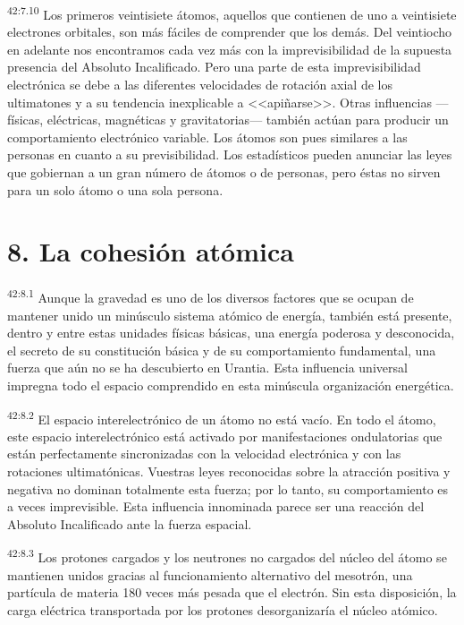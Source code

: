 \par
\textsuperscript{42:7.10} Los primeros veintisiete átomos, aquellos que contienen de uno a veintisiete electrones orbitales, son más fáciles de comprender que los demás. Del veintiocho en adelante nos encontramos cada vez más con la imprevisibilidad de la supuesta presencia del Absoluto Incalificado. Pero una parte de esta imprevisibilidad electrónica se debe a las diferentes velocidades de rotación axial de los ultimatones y a su tendencia inexplicable a <<apiñarse>>. Otras influencias ---físicas, eléctricas, magnéticas y gravitatorias--- también actúan para producir un comportamiento electrónico variable. Los átomos son pues similares a las personas en cuanto a su previsibilidad. Los estadísticos pueden anunciar las leyes que gobiernan a un gran número de átomos o de personas, pero éstas no sirven para un solo átomo o una sola persona.

\section*{8. La cohesión atómica}
\par
\textsuperscript{42:8.1} Aunque la gravedad es uno de los diversos factores que se ocupan de mantener unido un minúsculo sistema atómico de energía, también está presente, dentro y entre estas unidades físicas básicas, una energía poderosa y desconocida, el secreto de su constitución básica y de su comportamiento fundamental, una fuerza que aún no se ha descubierto en Urantia. Esta influencia universal impregna todo el espacio comprendido en esta minúscula organización energética.

\par
\textsuperscript{42:8.2} El espacio interelectrónico de un átomo no está vacío. En todo el átomo, este espacio interelectrónico está activado por manifestaciones ondulatorias que están perfectamente sincronizadas con la velocidad electrónica y con las rotaciones ultimatónicas. Vuestras leyes reconocidas sobre la atracción positiva y negativa no dominan totalmente esta fuerza; por lo tanto, su comportamiento es a veces imprevisible. Esta influencia innominada parece ser una reacción del Absoluto Incalificado ante la fuerza espacial.

\par
\textsuperscript{42:8.3} Los protones cargados y los neutrones no cargados del núcleo del átomo se mantienen unidos gracias al funcionamiento alternativo del mesotrón, una partícula de materia 180 veces más pesada que el electrón. Sin esta disposición, la carga eléctrica transportada por los protones desorganizaría el núcleo atómico.

